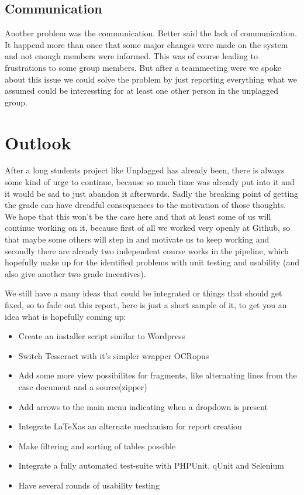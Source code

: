 \subsection{Communication}

Another problem was the communication. Better said the lack of communication. It happend more than once that some major changes were made on the system and not enough members were informed. This was of course leading to frustrations to some group members. But after a teammeeting were we spoke about this issue we could solve the problem by just reporting everything what we assumed could be interessting for at least one other person in the unplagged group.

\section{Outlook}

After a long students project like Unplagged has already been, there is always some kind of urge to continue, because so much time was already put into it and it would be sad to just abandon it afterwards. Sadly the breaking point of getting the grade can have dreadful consequences to the motivation of those thoughts. We hope that this won't be the case here and that at least some of us will continue working on it, because first of all we worked very openly at Github, so that maybe some others will step in and motivate us to keep working and secondly there are already two independent course works in the pipeline, which hopefully make up for the identified problems with unit testing and usability (and also give another two grade incentives).

We still have a many ideas that could be integrated or things that should get fixed, so to fade out this report, here is just a short sample of it, to get you an idea what is hopefully coming up:

\begin{itemize}
\item Create an installer script similar to Wordpress
\item Switch Tesseract with it's simpler wrapper OCRopus
\item Add some more view possibilites for fragments, like alternating lines from the case document and a source(zipper)
\item Add arrows to the main menu indicating when a dropdown is present
\item Integrate \LaTeX as an alternate mechanism for report creation
\item Make filtering and sorting of tables possible
\item Integrate a fully automated test-suite with PHPUnit, qUnit and Selenium
\item Have several rounds of usability testing
\end{itemize}